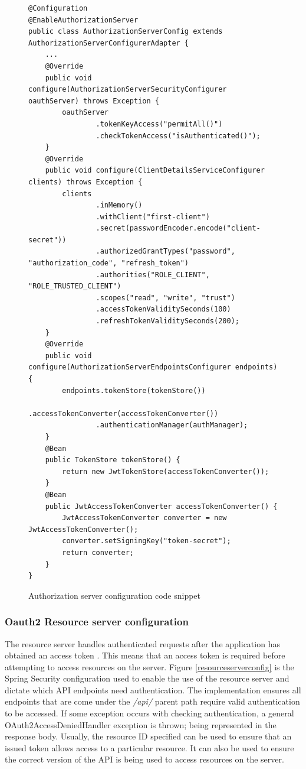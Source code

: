 \begin{figure}[ht]
    \centering
    \begin{lstlisting}
@Configuration
@EnableAuthorizationServer
public class AuthorizationServerConfig extends AuthorizationServerConfigurerAdapter {
    ...
    @Override
    public void configure(AuthorizationServerSecurityConfigurer oauthServer) throws Exception {
        oauthServer
                .tokenKeyAccess("permitAll()")
                .checkTokenAccess("isAuthenticated()");
    }
    @Override
    public void configure(ClientDetailsServiceConfigurer clients) throws Exception {
        clients
                .inMemory()
                .withClient("first-client")
                .secret(passwordEncoder.encode("client-secret"))
                .authorizedGrantTypes("password", "authorization_code", "refresh_token")
                .authorities("ROLE_CLIENT", "ROLE_TRUSTED_CLIENT")
                .scopes("read", "write", "trust")
                .accessTokenValiditySeconds(100)
                .refreshTokenValiditySeconds(200);
    }
    @Override
    public void configure(AuthorizationServerEndpointsConfigurer endpoints) {
        endpoints.tokenStore(tokenStore())
                .accessTokenConverter(accessTokenConverter())
                .authenticationManager(authManager);
    }
    @Bean
    public TokenStore tokenStore() {
        return new JwtTokenStore(accessTokenConverter());
    }
    @Bean
    public JwtAccessTokenConverter accessTokenConverter() {
        JwtAccessTokenConverter converter = new JwtAccessTokenConverter();
        converter.setSigningKey("token-secret");
        return converter;
    }
}
    \end{lstlisting}
    \caption{Authorization server configuration code snippet}
    \label{authorizationconfigsnippet}
\end{figure}


\clearpage
\subsubsection{Oauth2 Resource server configuration} \label{oauthresourcesection}
The resource server handles authenticated requests after the application has obtained an access token \cite{oauth2016resourceserver}.
This means that an access token is required before attempting to access resources on the server.
Figure \ref{resourceserverconfig} is the Spring Security configuration used to enable the use of the resource server and dictate which 
API endpoints need authentication.
The implementation ensures all endpoints that are come under the \textit{/api/} parent path require valid authentication to be accessed.
If some exception occurs with checking authentication, a general OAuth2AccessDeniedHandler exception is thrown; being represented in the
response body.
Usually, the resource ID specified can be used to ensure that an issued token allows access to a particular resource.
It can also be used to ensure the correct version of the API is being used to access resources on the server.


